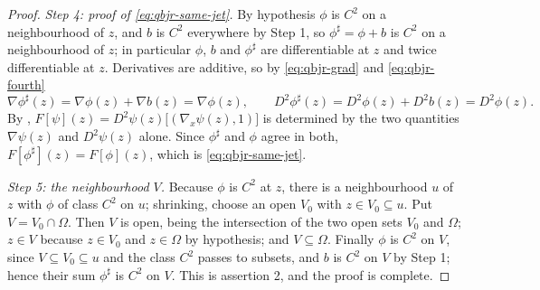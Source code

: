 \begin{proof}
\emph{Step 4: proof of \eqref{eq:qbjr-same-jet}.}
By hypothesis $\phi$ is $C^2$ on a neighbourhood of $z$, and $b$ is $C^2$
everywhere by Step 1, so $\phi^\sharp=\phi+b$ is $C^2$ on a neighbourhood of
$z$; in particular $\phi$, $b$ and $\phi^\sharp$ are differentiable at $z$ and
twice differentiable at $z$. Derivatives are additive, so by \eqref{eq:qbjr-grad}
and \eqref{eq:qbjr-fourth}
\[
  \nabla\phi^\sharp(z)=\nabla\phi(z)+\nabla b(z)=\nabla\phi(z),
  \qquad
  D^2\phi^\sharp(z)=D^2\phi(z)+D^2b(z)=D^2\phi(z).
\]
By , $F[\psi](z)=D^2\psi(z)\bigl[(\nabla_x\psi(z),1)\bigr]$ is
determined by the two quantities $\nabla\psi(z)$ and $D^2\psi(z)$ alone. Since
$\phi^\sharp$ and $\phi$ agree in both, $F[\phi^\sharp](z)=F[\phi](z)$, which is
\eqref{eq:qbjr-same-jet}.

\emph{Step 5: the neighbourhood $V$.}
Because $\phi$ is $C^2$ at $z$, there is a neighbourhood $u$ of $z$ with $\phi$
of class $C^2$ on $u$; shrinking, choose an open $V_0$ with $z\in V_0\subseteq u$.
Put $V=V_0\cap\Omega$. Then $V$ is open, being the intersection of the two open
sets $V_0$ and $\Omega$; $z\in V$ because $z\in V_0$ and $z\in\Omega$ by
hypothesis; and $V\subseteq\Omega$. Finally $\phi$ is $C^2$ on $V$, since
$V\subseteq V_0\subseteq u$ and the class $C^2$ passes to subsets, and $b$ is
$C^2$ on $V$ by Step 1; hence their sum $\phi^\sharp$ is $C^2$ on $V$. This is
assertion 2, and the proof is complete.
\end{proof}
